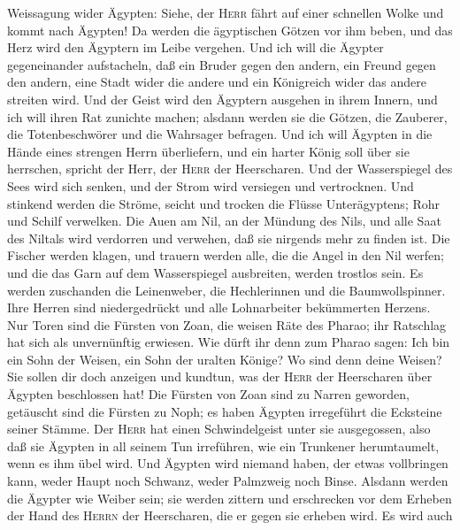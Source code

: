  Weissagung wider Ägypten: Siehe, der \textsc{Herr} fährt
auf einer schnellen Wolke und kommt nach Ägypten! Da werden die
ägyptischen Götzen vor ihm beben, und das Herz wird den Ägyptern im
Leibe vergehen.  Und ich will die Ägypter gegeneinander
aufstacheln, daß ein Bruder gegen den andern, ein Freund gegen den
andern, eine Stadt wider die andere und ein Königreich wider das andere
streiten wird.  Und der Geist wird den Ägyptern ausgehen
in ihrem Innern, und ich will ihren Rat zunichte machen; alsdann werden
sie die Götzen, die Zauberer, die Totenbeschwörer und die Wahrsager
befragen.  Und ich will Ägypten in die Hände eines
strengen Herrn überliefern, und ein harter König soll über sie
herrschen, spricht der Herr, der \textsc{Herr} der Heerscharen.
 Und der Wasserspiegel des Sees wird sich senken, und der
Strom wird versiegen und vertrocknen.  Und stinkend werden
die Ströme, seicht und trocken die Flüsse Unterägyptens; Rohr und Schilf
verwelken.  Die Auen am Nil, an der Mündung des Nils, und
alle Saat des Niltals wird verdorren und verwehen, daß sie nirgends mehr
zu finden ist.  Die Fischer werden klagen, und trauern
werden alle, die die Angel in den Nil werfen; und die das Garn auf dem
Wasserspiegel ausbreiten, werden trostlos sein.  Es werden
zuschanden die Leinenweber, die Hechlerinnen und die Baumwollspinner.
 Ihre Herren sind niedergedrückt und alle Lohnarbeiter
bekümmerten Herzens.  Nur Toren sind die Fürsten von
Zoan, die weisen Räte des Pharao; ihr Ratschlag hat sich als
unvernünftig erwiesen. Wie dürft ihr denn zum Pharao sagen: Ich bin ein
Sohn der Weisen, ein Sohn der uralten Könige?  Wo sind
denn deine Weisen? Sie sollen dir doch anzeigen und kundtun, was der
\textsc{Herr} der Heerscharen über Ägypten beschlossen hat!
 Die Fürsten von Zoan sind zu Narren geworden, getäuscht
sind die Fürsten zu Noph; es haben Ägypten irregeführt die Ecksteine
seiner Stämme.  Der \textsc{Herr} hat einen
Schwindelgeist unter sie ausgegossen, also daß sie Ägypten in all seinem
Tun irreführen, wie ein Trunkener herumtaumelt, wenn es ihm übel wird.
 Und Ägypten wird niemand haben, der etwas vollbringen
kann, weder Haupt noch Schwanz, weder Palmzweig noch Binse.
 Alsdann werden die Ägypter wie Weiber sein; sie werden
zittern und erschrecken vor dem Erheben der Hand des \textsc{Herrn} der
Heerscharen, die er gegen sie erheben wird.  Es wird auch
